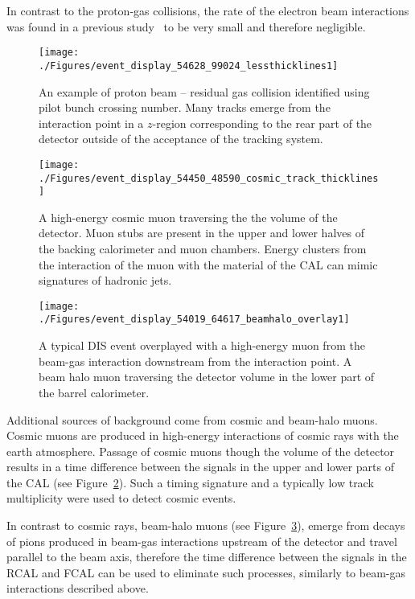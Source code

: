 In contrast to the proton-gas collisions, the rate of the electron beam interactions was found in a previous study~\cite{thesis:moritz:2001} to be very small and therefore negligible.

\begin{figure}[ht]
	\centering
	\texttt{[image: ./Figures/event\_display\_54628\_99024\_lessthicklines1]} 
	\caption{An example of proton beam -- residual gas collision identified using pilot bunch crossing number. Many tracks emerge from the interaction point in a $z$-region corresponding to the rear part of the \zeus detector outside of the acceptance of the tracking system.}
	\label{fig:beamgaseventdisplay}
\end{figure}

\begin{figure}[htbp]
	\centering
	\texttt{[image: ./Figures/event\_display\_54450\_48590\_cosmic\_track\_thicklines]} 
	\caption{A high-energy cosmic muon traversing the the volume of the \zeus detector. Muon stubs are present in the upper and lower halves of the backing calorimeter and muon chambers. Energy clusters from the interaction of the muon with the material of the CAL can mimic signatures of hadronic jets.}
	\label{fig:cosmiceventdisplay}
\end{figure}

\begin{figure}[htbp!]
	\centering
	\texttt{[image: ./Figures/event\_display\_54019\_64617\_beamhalo\_overlay1]} 
	\caption{A typical DIS event overplayed with a high-energy muon from the beam-gas interaction downstream from the interaction point. A beam halo muon traversing the detector volume in the lower part of the barrel calorimeter.}
	\label{fig:beamhaloeventdisplay}
\end{figure}

Additional sources of background come from cosmic and beam-halo muons. Cosmic muons are produced in high-energy interactions of cosmic rays with the earth atmosphere. Passage of cosmic muons though the volume of the detector results in a time difference between the signals in the upper and lower parts of the CAL (see Figure~\ref{fig:cosmiceventdisplay}). Such a timing signature and a typically low track multiplicity were used to detect cosmic events. 

In contrast to cosmic rays, beam-halo muons (see Figure~\ref{fig:beamhaloeventdisplay}), emerge from decays of pions produced in beam-gas interactions upstream of the detector and travel parallel to the beam axis, therefore the time difference between the signals in the RCAL and FCAL can be used to eliminate such processes, similarly to beam-gas interactions described above. 

